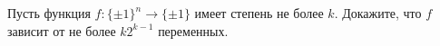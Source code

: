 Пусть функция $f\colon \{\pm 1\}^n \to \{\pm 1\}$ имеет степень не более $k$. Докажите, что $f$ зависит
от не более $k 2^{k - 1}$ переменных.
